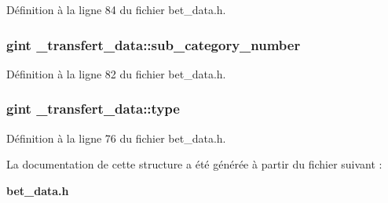 Définition à la ligne 84 du fichier bet\_\-data.h.

\subsubsection[{sub\_\-category\_\-number}]{\setlength{\rightskip}{0pt plus 5cm}gint {\bf \_\-transfert\_\-data::sub\_\-category\_\-number}}\label{struct__transfert__data_aa03307c5d5aa09612f3d1da289397c8c}


Définition à la ligne 82 du fichier bet\_\-data.h.

\subsubsection[{type}]{\setlength{\rightskip}{0pt plus 5cm}gint {\bf \_\-transfert\_\-data::type}}\label{struct__transfert__data_a0473435f6eac8d000573d1e9e5c7cce2}


Définition à la ligne 76 du fichier bet\_\-data.h.



La documentation de cette structure a été générée à partir du fichier suivant :\begin{DoxyCompactItemize}
\item 
{\bf bet\_\-data.h}\end{DoxyCompactItemize}
